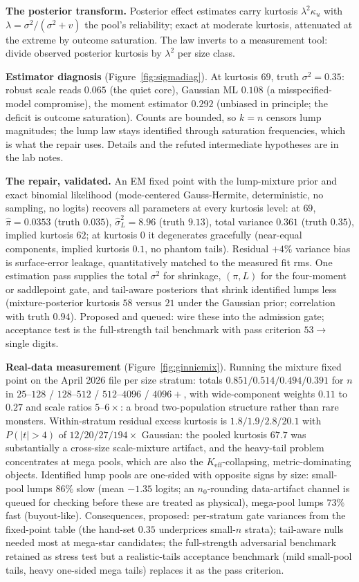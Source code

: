 \documentclass[11pt]{article}
\begin{document}
\textbf{The posterior transform.} Posterior effect estimates carry
kurtosis $\lambda^2 \kappa_u$ with $\lambda = \sigma^2/(\sigma^2 + v)$
the pool's reliability; exact at moderate kurtosis, attenuated at the
extreme by outcome saturation. The law inverts to a measurement tool:
divide observed posterior kurtosis by $\lambda^2$ per size class.

\textbf{Estimator diagnosis} (Figure~\ref{fig:sigmadiag}). At kurtosis
$69$, truth $\sigma^2 = 0.35$: robust scale reads $0.065$ (the quiet
core), Gaussian ML $0.108$ (a misspecified-model compromise), the
moment estimator $0.292$ (unbiased in principle; the deficit is outcome
saturation). Counts are bounded, so $k = n$ censors lump magnitudes;
the lump law stays identified through saturation frequencies, which is
what the repair uses. Details and the refuted intermediate hypotheses
are in the lab notes.

\textbf{The repair, validated.} An EM fixed point with the lump-mixture
prior and exact binomial likelihood (mode-centered Gauss-Hermite,
deterministic, no sampling, no logits) recovers all parameters at every
kurtosis level: at $69$, $\hat\pi = 0.0353$ (truth $0.035$),
$\hat\sigma_L^2 = 8.96$ (truth $9.13$), total variance $0.361$ (truth
$0.35$), implied kurtosis $62$; at kurtosis $0$ it degenerates
gracefully (near-equal components, implied kurtosis $0.1$, no phantom
tails). Residual $+4\%$ variance bias is surface-error leakage,
quantitatively matched to the measured fit rms. One estimation pass
supplies the total $\sigma^2$ for shrinkage, $(\pi, L)$ for the
four-moment or saddlepoint gate, and tail-aware posteriors that shrink
identified lumps less (mixture-posterior kurtosis $58$ versus $21$
under the Gaussian prior; correlation with truth $0.94$). Proposed and
queued: wire these into the admission gate; acceptance test is the
full-strength tail benchmark with pass criterion $53 \to$ single
digits.


\textbf{Real-data measurement} (Figure~\ref{fig:ginniemix}). Running the
mixture fixed point on the April 2026 file per size stratum: totals
$0.851 / 0.514 / 0.494 / 0.391$ for $n$ in $25$--$128$ / $128$--$512$ /
$512$--$4096$ / $4096{+}$, with wide-component weights $0.11$ to $0.27$
and scale ratios $5$--$6\times$: a broad two-population structure
rather than rare monsters. Within-stratum residual excess kurtosis is
$1.8 / 1.9 / 2.8 / 20.1$ with $P(|t|>4)$ of $12/20/27/194\times$
Gaussian: the pooled kurtosis $67.7$ was substantially a cross-size
scale-mixture artifact, and the heavy-tail problem concentrates at mega
pools, which are also the $K_{\mathrm{eff}}$-collapsing,
metric-dominating objects. Identified lump pools are one-sided with
opposite signs by size: small-pool lumps $86\%$ slow (mean $-1.35$
logits; an $n_0$-rounding data-artifact channel is queued for checking
before these are treated as physical), mega-pool lumps $73\%$ fast
(buyout-like). Consequences, proposed: per-stratum gate variances from
the fixed-point table (the hand-set $0.35$ underprices small-$n$
strata); tail-aware nulls needed most at mega-star candidates; the
full-strength adversarial benchmark retained as stress test but a
realistic-tails acceptance benchmark (mild small-pool tails, heavy
one-sided mega tails) replaces it as the pass criterion.
\end{document}
